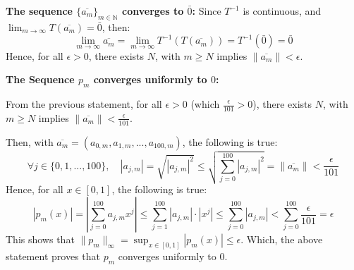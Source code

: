 \documentclass{article}
\begin{document}
\begin{itemize}
    \hfill

    \textbf{The sequence $\{\overline{a_m}\}_{m\in\mathbb{N}}$ converges to $\bar{0}$:}
    Since $T^{-1}$ is continuous, and $\lim_{m\rightarrow\infty}T(\overline{a_m})=\bar{0}$, then:
    $$\lim_{m\rightarrow\infty}\overline{a_m}=\lim_{m\rightarrow\infty}T^{-1}(T(\overline{a_m})) = T^{-1}(\bar{0})=\bar{0}$$
    Hence, for all $\epsilon>0$, there exists $N$, with $m\geq N$ implies $\|\overline{a_m}\|<\epsilon$.

    \hfill

    \textbf{The Sequence $p_m$ converges uniformly to $0$:}

    From the previous statement, for all $\epsilon>0$ (which $\frac{\epsilon}{101}>0$), there exists $N$, with $m\geq N$ implies $\|\overline{a_m}\|<\frac{\epsilon}{101}$.

    Then, with $\overline{a_m}=(a_{0,m},a_{1,m},...,a_{100,m})$, the following is true:
    $$\forall j\in\{0,1,...,100\},\quad |a_{j,m}| = \sqrt{|a_{j,m}|^2}\leq \sqrt{\sum_{j=0}^{100}|a_{j,m}|^2} = \|\overline{a_m}\| < \frac{\epsilon}{101}$$
    Hence, for all $x\in [0,1]$, the following is true:
    $$|p_m(x)| = \left|\sum_{j=0}^{100}a_{j,m}x^j\right| \leq \sum_{j=1}^{100}|a_{j,m}|\cdot|x^j| \leq \sum_{j=0}^{100}|a_{j,m}| < \sum_{j=0}^{100}\frac{\epsilon}{101} = \epsilon$$
    This shows that $\|p_m\|_\infty = \sup_{x\in[0,1]}|p_m(x)|\leq \epsilon$. Which, the above statement proves that $p_m$ converges uniformly to $0$.


    
\begin{comment}
    and define the map $T:\mathcal{P}_{100}([0,1])\rightarrow\mathbb{R}^{101}$ by:
    $$T(p) = (p(x_1),p(x_2),...,p(x_{101}))$$

    \hfill

    \textbf{The map $T$ is a Linear Map:}

    For the zero function $0\in \mathcal{P}_{100}([0,1])$, it is clear that $T(0)=(0,0,...,0)\in\mathbb{R}^{101}$.

    Then, for all $p,q\in \mathcal{P}_{100}([0,1])$:
    $$T(p+q) = ((p+q)(x_1),(p+q)(x_2),...,(p+q)(x_{101})) = (p(x_1)+q(x_1),p(x_2)+q(x_2),...,p(x_{101})+q(x_{101}))$$
    $$ = (p(x_1),p(x_2),...,p(x_{101})) + (q(x_1),q(x_2),...,q(x_{101}))= T(p)+T(q)$$
    Also, for all $\lambda\in\mathbb{R}$ and $p\in\mathcal{P}_{100}([0,1])$:
    $$T(\lambda p) = ((\lambda p)(x_1),(\lambda p)(x_2),...,(\lambda p)(x_{101})) = (\lambda \cdot p(x_1), \lambda\cdot p(x_2),...,\lambda\cdot p(x_{101}))$$
    $$ = \lambda(p(x_1),p(x_2),...,p(x_{101})) = \lambda T(p)$$
    Hence, with the above three criteria, $T$ is a linear map from $\mathcal{P}_{100}([0,1])\rightarrow\mathbb{R}^{101}$.


\end{comment}
\end{itemize}
\end{document}
